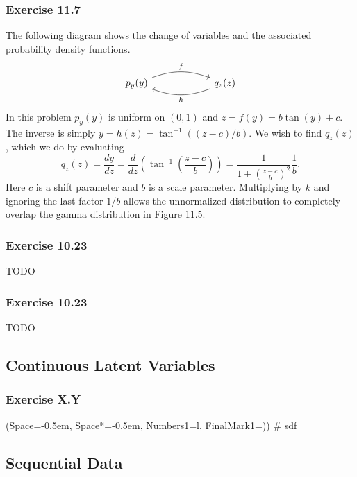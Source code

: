 \documentclass[12pt, a4paper]{article}
\newcommand{\listSpace}{-0.5em}%
\begin{document}
\subsubsection*{Exercise 11.7}
The following diagram shows the change of variables and the associated probability density functions.
\[\begin{tikzcd}[column sep=6em]
p_y(y) \arrow[bend left = 20]{r}{f} & q_z(z) \arrow[ bend left = 20]{l}{h}
\end{tikzcd}\]
In this problem $p_y(y)$ is uniform on $(0, 1)$ and $z = f(y) = b \tan (y) + c$.
The inverse is simply $y = h(z) = \tan^{-1}\left( (z- c) / b \right)$.
We wish to find $q_z(z)$, which we do by evaluating
\begin{equation*}
q_z(z) = \frac{d y}{d z} = \frac{d }{d z} \left( \tan^{-1}\left( \frac{z - c}{b} \right) \right)
=
\frac{1}{1 + \left( \frac{z - c}{b} \right)^2} \frac{1}{b}.
\end{equation*}
Here $c$ is a shift parameter and $b$ is a scale parameter.
Multiplying by $k$ and ignoring the last factor $1/b$ allows the unnormalized distribution to completely overlap the gamma distribution in Figure 11.5.


\subsubsection*{Exercise 10.23}
TODO

\subsubsection*{Exercise 10.23}
TODO

\subsection{Continuous Latent Variables}
\subsubsection*{Exercise X.Y}
\begin{easylist}[enumerate]
	\ListProperties(Space=\listSpace, Space*=\listSpace, Numbers1=l, FinalMark1={)})
	# sdf
\end{easylist}

\subsection{Sequential Data}
\end{document}
